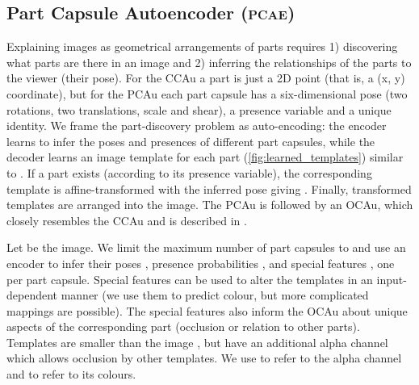 \documentclass{article}
\newcommand{\comment}[1]{} \newcommand{\ak}[1]{\textcolor{blue}{\textbf{ak}: #1}}
\begin{document}
\subsection{Part Capsule Autoencoder (\textsc{pcae})}
\label{sec:img_capsule}
\comment{\begin{figure}
		\centering
		\texttt{[image: figs/image\_capsule]}
		\caption{\ak{}{redo the figure} Image capsule network.
			An \gls{MLP} predicts poses (black dots) of the low-level capsules that correspond to object-parts from the image.
			Higher-level object capsules are activated by another \gls{MLP} that receives the states of the low-level capsules as input. The high-level object capsules then try to predict the parameters of lower-level part capsules.
			Each object capsule predicts each part capsule separately, and the poses of the part capsules are modelled by a mixture model of different predictions.
			Finally, reconstructed poses of the part capsules are used to transform learned templates, which are then put together into an image reconstruction.
		}
		\label{fig:image_capsule}
	\end{figure}
}
Explaining images as geometrical arrangements of parts requires 1) discovering what parts are there in an image and 2) inferring the relationships of the parts to the viewer (their pose).
For the \gls{CCAu} a part is just a 2D point (that is, a (x, y) coordinate), but for the \gls{PCAu} each part capsule  has a six-dimensional pose  (two rotations, two translations, scale and shear), a presence variable  and a unique identity.
We frame the part-discovery problem as auto-encoding: the encoder learns to infer the poses and presences of different part capsules, while the decoder learns an image template  for each part (\cref{fig:learned_templates}) similar to \cite{Tieleman2014thesis,Eslami2016air}.
If a part exists (according to its presence variable), the corresponding template is affine-transformed with the inferred pose giving .
Finally, transformed templates are arranged into the image.
The \gls{PCAu} is followed by an \gls{OCAu}, which closely resembles the \gls{CCAu} and is described in .

Let  be the image.
We limit the maximum number of part capsules to  and use an encoder to infer their poses , presence probabilities , and special features , one per part capsule.
Special features can be used to alter the templates in an input-dependent manner (we use them to predict colour, but more complicated mappings are possible). The special features also inform the \gls{OCAu} about unique aspects of the corresponding part (\!\eg occlusion or relation to other parts).
Templates  are smaller than the image , but have an additional alpha channel which allows occlusion by other templates. 
We use  to refer to the alpha channel and  to refer to its colours.
\end{document}
